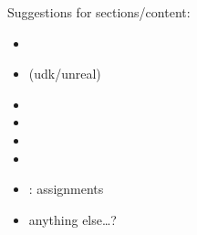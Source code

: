 \label{sec:section7}

Suggestions for sections/content:
\begin{itemize} 
	\item {}
	\item {} (udk/unreal)
	\item {}
	\item {}
	\item {}
	\item {}
	\item {}: assignments
	\item anything else\ldots?
\end{itemize} 


